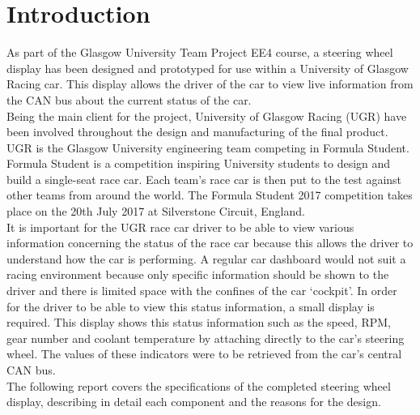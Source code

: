 \documentclass[a4paper,12pt]{article}
\begin{document}
\newpage
\tableofcontents


\newpage
\section{Introduction}
\label{sec:introduction}

As part of the Glasgow University Team Project EE4 course, a steering wheel display has been designed and prototyped for use within a University of Glasgow Racing car. This display allows the driver of the car to view live information from the CAN bus about the current status of the car. \\

Being the main client for the project, University of Glasgow Racing (UGR) have been involved throughout the design and manufacturing of the final product. UGR is the Glasgow University engineering team competing in Formula Student. Formula Student is a competition inspiring University students to design and build a single-seat race car. Each team’s race car is then put to the test against other teams from around the world. The Formula Student 2017 competition takes place on the 20th July 2017 at Silverstone Circuit, England. \\

It is important for the UGR race car driver to be able to view various information concerning the status of the race car because this allows the driver to understand how the car is performing. A regular car dashboard would not suit a racing environment because only specific information should be shown to the driver and there is limited space with the confines of the car `cockpit'. In order for the driver to be able to view this status information, a small display is required. This display shows this status information such as the speed, RPM, gear number and coolant temperature by attaching directly to the car’s steering wheel. The values of these indicators were to be retrieved from the car's central CAN bus. \\

The following report covers the specifications of the completed steering wheel display, describing in detail each component and the reasons for the design. \\



\end{document}
